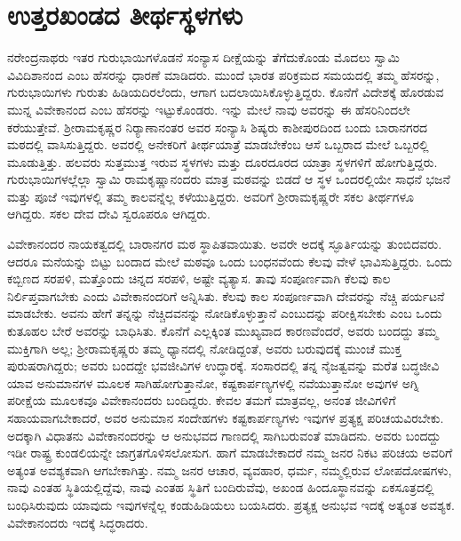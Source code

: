 
\chapter{ಉತ್ತರಖಂಡದ ತೀರ್ಥಸ್ಥಳಗಳು }

ನರೇಂದ್ರನಾಥರು ಇತರ ಗುರುಭಾಯಿಗಳೊಡನೆ ಸಂನ್ಯಾಸ ದೀಕ್ಷೆಯನ್ನು ತೆಗೆದುಕೊಂಡು ಮೊದಲು ಸ್ವಾಮಿ ವಿವಿದಿಶಾನಂದ ಎಂಬ ಹೆಸರನ್ನು ಧಾರಣೆ ಮಾಡಿದರು. ಮುಂದೆ ಭಾರತ ಪರಿಕ್ರಮದ ಸಮಯದಲ್ಲಿ ತಮ್ಮ ಹೆಸರನ್ನು, ಗುರುಭಾಯಿಗಳು ಗುರುತು ಹಿಡಿಯದಿರಲೆಂದು, ಆಗಾಗ ಬದಲಾಯಿಸಿಕೊಳ್ಳುತ್ತಿದ್ದರು. ಕೊನೆಗೆ ವಿದೇಶಕ್ಕೆ ಹೊರಡುವ ಮುನ್ನ ವಿವೇಕಾನಂದ ಎಂಬ ಹೆಸರನ್ನು ಇಟ್ಟುಕೊಂಡರು. ಇನ್ನು ಮೇಲೆ ನಾವು ಅವರನ್ನು ಈ ಹೆಸರಿನಿಂದಲೇ ಕರೆಯುತ್ತೇವೆ. ಶ‍್ರೀರಾಮಕೃಷ್ಣರ ನಿರ‍್ಯಾಣಾನಂತರ ಅವರ ಸಂನ್ಯಾಸಿ ಶಿಷ್ಯರು ಕಾಶೀಪುರದಿಂದ ಬಂದು ಬಾರಾನಗರದ ಮಠದಲ್ಲಿ ವಾಸಿಸುತ್ತಿದ್ದರು. ಅವರಲ್ಲಿ ಅನೇಕರಿಗೆ ತೀರ್ಥಯಾತ್ರೆ ಮಾಡಬೇಕೆಂಬ ಆಸೆ ಒಬ್ಬರಾದ ಮೇಲೆ ಒಬ್ಬರಲ್ಲಿ ಮೂಡುತ್ತಿತ್ತು. ಹಲವರು ಸುತ್ತಮುತ್ತ ಇರುವ ಸ್ಥಳಗಳು ಮತ್ತು ದೂರದೂರದ ಯಾತ್ರಾ ಸ್ಥಳಗಳಿಗೆ ಹೋಗುತ್ತಿದ್ದರು. ಗುರುಭಾಯಿಗಳಲ್ಲೆಲ್ಲಾ ಸ್ವಾಮಿ ರಾಮಕೃಷ್ಣಾನಂದರು ಮಾತ್ರ ಮಠವನ್ನು ಬಿಡದೆ ಆ ಸ್ಥಳ ಒಂದರಲ್ಲಿಯೇ ಸಾಧನೆ ಭಜನೆ ಮತ್ತು ಪೂಜೆ ಇವುಗಳಲ್ಲಿ ತಮ್ಮ ಕಾಲವನ್ನೆಲ್ಲ ಕಳೆಯುತ್ತಿದ್ದರು. ಅವರಿಗೆ ಶ‍್ರೀರಾಮಕೃಷ್ಣರೇ ಸಕಲ ತೀರ್ಥಗಳೂ ಆಗಿದ್ದರು. ಸಕಲ ದೇವ ದೇವಿ ಸ್ವರೂಪರೂ ಆಗಿದ್ದರು.

ವಿವೇಕಾನಂದರ ನಾಯಕತ್ವದಲ್ಲಿ ಬಾರಾನಗರ ಮಠ ಸ್ಥಾಪಿತವಾಯಿತು. ಅವರೇ ಅದಕ್ಕೆ ಸ್ಫೂರ್ತಿಯನ್ನು ತುಂಬಿದವರು. ಆದರೂ ಮನೆಯನ್ನು ಬಿಟ್ಟು ಬಂದಾದ ಮೇಲೆ ಮಠವೂ ಒಂದು ಬಂಧನವೆಂದು ಕೆಲವು ವೇಳೆ ಭಾವಿಸುತ್ತಿದ್ದರು. ಒಂದು ಕಬ್ಬಿಣದ ಸರಪಳಿ, ಮತ್ತೊಂದು ಚಿನ್ನದ ಸರಪಳಿ, ಅಷ್ಟೇ ವ್ಯತ್ಯಾಸ. ತಾವು ಸಂಪೂರ್ಣವಾಗಿ ಕೆಲವು ಕಾಲ ನಿರ್ಲಿಪ್ತವಾಗಬೇಕು ಎಂದು ವಿವೇಕಾನಂದರಿಗೆ ಅನ್ನಿಸಿತು. ಕೆಲವು ಕಾಲ ಸಂಪೂರ್ಣವಾಗಿ ದೇವರನ್ನು ನೆಚ್ಚಿ ಪರ್ಯಟನೆ ಮಾಡಬೇಕು. ಅವನು ಹೇಗೆ ತನ್ನನ್ನು ನೆಚ್ಚಿದವನನ್ನು ನೋಡಿಕೊಳ್ಳುತ್ತಾನೆ ಎಂಬುದನ್ನು ಪರೀಕ್ಷಿಸಬೇಕು ಎಂಬ ಒಂದು ಕುತೂಹಲ ಬೇರೆ ಅವರನ್ನು ಬಾಧಿಸಿತು. ಕೊನೆಗೆ ಎಲ್ಲಕ್ಕಿಂತ ಮುಖ್ಯವಾದ ಕಾರಣವೆಂದರೆ, ಅವರು ಬಂದದ್ದು ತಮ್ಮ ಮುಕ್ತಿಗಾಗಿ ಅಲ್ಲ; ಶ‍್ರೀರಾಮಕೃಷ್ಣರು ತಮ್ಮ ಧ್ಯಾನದಲ್ಲಿ ನೋಡಿದ್ದಂತೆ, ಅವರು ಬರುವುದಕ್ಕೆ ಮುಂಚೆ ಮುಕ್ತ ಪುರುಷರಾಗಿದ್ದರು; ಅವರು ಬಂದದ್ದೇ ಭವಜೀವಿಗಳ ಉದ್ಧಾರಕ್ಕೆ. ಸಂಸಾರದಲ್ಲಿ ತನ್ನ ನೈಜತ್ವವನ್ನು ಮರೆತ ಬದ್ಧಜೀವಿ ಯಾವ ಅನುಮಾನಗಳ ಮೂಲಕ ಸಾಗಿಹೋಗುತ್ತಾನೋ, ಕಷ್ಟಕಾರ್ಪಣ್ಯಗಳಲ್ಲಿ ನವೆಯುತ್ತಾನೋ ಅವುಗಳ ಅಗ್ನಿ ಪರೀಕ್ಷೆಯ ಮೂಲಕವೂ ವಿವೇಕಾನಂದರು ಬಂದಿದ್ದರು. ಕೇವಲ ತಮಗೆ ಮಾತ್ರವಲ್ಲ, ಅನಂತ ಜೀವಿಗಳಿಗೆ ಸಹಾಯವಾಗಬೇಕಾದರೆ, ಅವರ ಅನುಮಾನ ಸಂದೇಹಗಳು ಕಷ್ಟಕಾರ್ಪಣ್ಯಗಳು ಇವುಗಳ ಪ್ರತ್ಯಕ್ಷ ಪರಿಚಯವಿರಬೇಕು. ಅದಕ್ಕಾಗಿ ವಿಧಾತನು ವಿವೇಕಾನಂದರನ್ನು ಆ ಅನುಭವದ ಗಾಣದಲ್ಲಿ ಸಾಗಿಬರುವಂತೆ ಮಾಡಿದನು. ಅವರು ಬಂದದ್ದು ಇಡೀ ರಾಷ್ಟ್ರ ಕುಂಡಲಿಯನ್ನೇ ಜಾಗ್ರತಗೊಳಿಸಲೋಸುಗ. ಹಾಗೆ ಮಾಡಬೇಕಾದರೆ ನಮ್ಮ ಜನರ ನಿಕಟ ಪರಿಚಯ ಅವರಿಗೆ ಅತ್ಯಂತ ಅವಶ್ಯಕವಾಗಿ ಆಗಬೇಕಾಗಿತ್ತು. ನಮ್ಮ ಜನರ ಆಚಾರ, ವ್ಯವಹಾರ, ಧರ್ಮ, ನಮ್ಮಲ್ಲಿರುವ ಲೋಪದೋಷಗಳು, ನಾವು ಎಂತಹ ಸ್ಥಿತಿಯಲ್ಲಿದ್ದೆವು, ನಾವು ಎಂತಹ ಸ್ಥಿತಿಗೆ ಬಂದಿರುವೆವು, ಅಖಂಡ ಹಿಂದೂಸ್ಥಾನವನ್ನು ಏಕಸೂತ್ರದಲ್ಲಿ ಬಂಧಿಸಿರುವುದು ಯಾವುದು ಇವುಗಳನ್ನೆಲ್ಲ ಕಂಡುಹಿಡಿಯಲು ಬಯಸಿದರು. ಪ್ರತ್ಯಕ್ಷ ಅನುಭವ ಇದಕ್ಕೆ ಅತ್ಯಂತ ಅವಶ್ಯಕ. ವಿವೇಕಾನಂದರು ಇದಕ್ಕೆ ಸಿದ್ಧರಾದರು.

